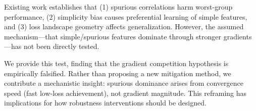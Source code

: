 Existing work establishes that (1) spurious correlations harm worst-group performance, (2) simplicity bias causes preferential learning of simple features, and (3) loss landscape geometry affects generalization. However, the assumed mechanism---that simple/spurious features dominate through stronger gradients---has not been directly tested.

We provide this test, finding that the gradient competition hypothesis is empirically falsified. Rather than proposing a new mitigation method, we contribute a mechanistic insight: spurious dominance arises from convergence speed (fast low-loss achievement), not gradient magnitude. This reframing has implications for how robustness interventions should be designed.
